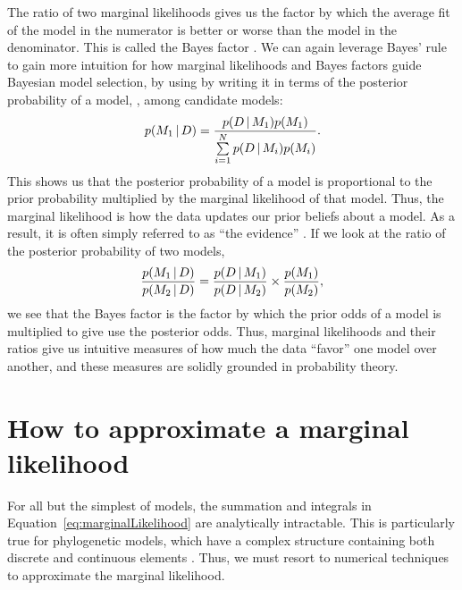 \begin{linenomath}
The ratio of two marginal likelihoods gives us the factor by which the
average fit of the model in the numerator is better or worse than the
model in the denominator.
This is called the Bayes factor \citep{Jeffreys1935}.
We can again leverage Bayes' rule to gain more intuition for how marginal
likelihoods and Bayes factors guide Bayesian model selection, by using by
writing it in terms of the posterior probability of a model, \model[1],
among \nmodels candidate models:
\begin{equation}
    p(\model[1] \given \data) = \frac{
        p(\data \given \model[1])
        p(\model[1])
    }{
        \sum\limits_{i=1}^{\nmodels}
        p(\data \given \model[i])
        p(\model[i])
    }.
    \label{eq:bayesRuleModelProbability}
\end{equation}
This shows us that the posterior probability of a model is proportional to the
prior probability multiplied by the marginal likelihood of that model.
Thus, the marginal likelihood is how the data updates our prior beliefs about a
model.
As a result, it is often simply referred to as ``the evidence''
\citep{MacKay2005}.
If we look at the ratio of the posterior probability of two models,
\begin{equation}
    \frac{
        p(\model[1] \given \data)
    }{
        p(\model[2] \given \data)
    }
    =
    \frac{
        p(\data \given \model[1])
    }{
        p(\data \given \model[2])
    }
    \times
    \frac{
        p(\model[1])
    }{
        p(\model[2])
    },
    \label{eq:modelOdds}
\end{equation}
we see that the Bayes factor is the factor by which the prior odds of a model
is multiplied to give use the posterior odds.
Thus, marginal likelihoods and their ratios give us intuitive measures of how
much the data ``favor'' one model over another, and these measures are solidly
grounded in probability theory.
\end{linenomath}

\section{How to approximate a marginal likelihood}

For all but the simplest of models, the summation and integrals in
Equation~\ref{eq:marginalLikelihood}
are analytically intractable.
This is particularly true for phylogenetic models, which have a complex
structure containing both discrete and continuous elements \citep{Kim2000}.
Thus, we must resort to numerical techniques to approximate the marginal
likelihood.


